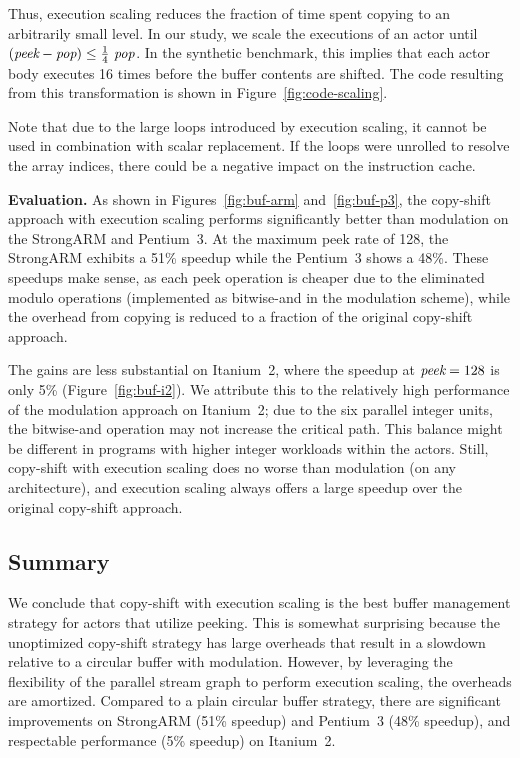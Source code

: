 Thus, execution scaling reduces the fraction of time spent copying to
an arbitrarily small level.  In our study, we scale the executions of
an actor until $(\mbox{\it peek} - \mbox{\it pop}) \leq
\frac{1}{4}~\mbox{\it pop}$.  In the synthetic benchmark, this implies
that each actor body executes 16 times before the buffer contents are
shifted.  The code resulting from this transformation is shown in
Figure~\ref{fig:code-scaling}.

Note that due to the large loops introduced by execution scaling, it
cannot be used in combination with scalar replacement.  If the loops
were unrolled to resolve the array indices, there could be a negative
impact on the instruction cache.

{\bf Evaluation.}  As shown in Figures~\ref{fig:buf-arm}
and~\ref{fig:buf-p3}, the copy-shift approach with execution scaling
performs significantly better than modulation on the StrongARM and
Pentium~3.  At the maximum peek rate of 128, the StrongARM exhibits a
51\% speedup while the Pentium~3 shows a 48\%.  These speedups make
sense, as each peek operation is cheaper due to the eliminated modulo
operations (implemented as bitwise-and in the modulation scheme),
while the overhead from copying is reduced to a fraction of the
original copy-shift approach.

The gains are less substantial on Itanium~2, where the speedup at
$\mbox{\it peek} = 128$ is only 5\% (Figure~\ref{fig:buf-i2}).  We
attribute this to the relatively high performance of the modulation
approach on Itanium~2; due to the six parallel integer units, the
bitwise-and operation may not increase the critical path.  This
balance might be different in programs with higher integer workloads
within the actors.  Still, copy-shift with execution scaling does no
worse than modulation (on any architecture), and execution scaling
always offers a large speedup over the original copy-shift approach.

\subsection{Summary}

We conclude that copy-shift with execution scaling is the best buffer
management strategy for actors that utilize peeking.  This is somewhat
surprising because the unoptimized copy-shift strategy has large
overheads that result in a slowdown relative to a circular buffer with
modulation.  However, by leveraging the flexibility of the parallel
stream graph to perform execution scaling, the overheads are
amortized.  Compared to a plain circular buffer strategy, there are
significant improvements on StrongARM (51\% speedup) and Pentium~3
(48\% speedup), and respectable performance (5\% speedup) on
Itanium~2.

